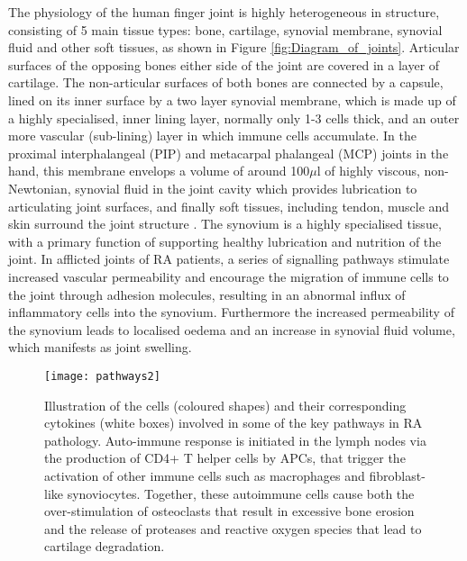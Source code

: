 \documentclass[twoside]{bhamthesis}
\theoremstyle{definition}
\begin{document}
The physiology of the human finger joint is highly heterogeneous in structure, consisting of 5 main tissue types: bone, cartilage, synovial membrane, synovial fluid and other soft tissues, as shown in Figure \ref{fig:Diagram_of_joints}. Articular surfaces of the opposing bones either side of the joint are covered in a layer of cartilage. The non-articular surfaces of both bones are connected by a capsule, lined on its inner surface by a two layer synovial membrane, which is made up of a highly specialised, inner lining layer, normally only 1-3 cells thick, and an outer more vascular (sub-lining) layer in which immune cells accumulate. In the proximal interphalangeal (PIP) and metacarpal phalangeal (MCP) joints in the hand, this membrane envelops a volume of around 100$\mu$l of highly viscous, non-Newtonian, synovial fluid in the joint cavity which provides lubrication to articulating joint surfaces, and finally soft tissues, including tendon, muscle and skin surround the joint structure \cite{orr2017synovial}. The synovium is a highly specialised tissue, with a primary function of supporting healthy lubrication and nutrition of the joint. In afflicted joints of RA patients, a series of signalling pathways stimulate increased vascular permeability and encourage the migration of immune cells to the joint through adhesion molecules, resulting in an abnormal influx of inflammatory cells into the synovium. Furthermore the increased permeability of the synovium leads to localised oedema and an increase in synovial fluid volume, which manifests as joint swelling.

\begin{figure}[!ht]
\centering\texttt{[image: pathways2]}
\caption{Illustration of the cells (coloured shapes) and their corresponding cytokines (white boxes) involved in some of the key pathways in RA pathology. Auto-immune response is initiated in the lymph nodes via the production of CD4+ T helper cells by APCs, that trigger the activation of other immune cells such as macrophages and fibroblast-like synoviocytes. Together, these autoimmune cells cause both the over-stimulation of osteoclasts that result in excessive bone erosion and the release of proteases and reactive oxygen species that lead to cartilage degradation.}
\label{fig:pathways}
\end{figure}
\end{document}
